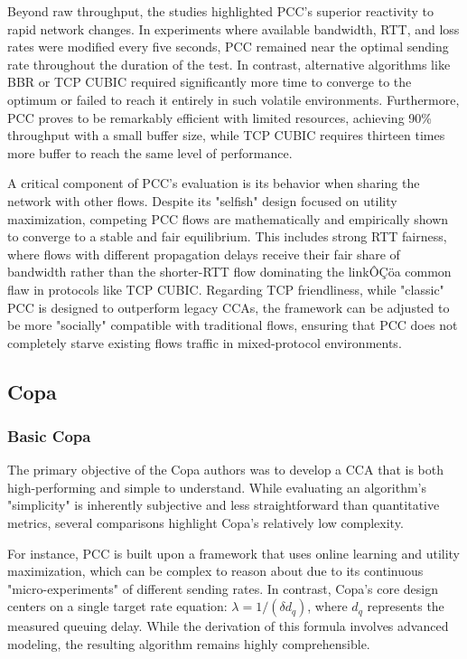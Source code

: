 \documentclass[conference]{IEEEtran}
\begin{document}
Beyond raw throughput, the studies highlighted PCC's superior reactivity to rapid network changes. 
In experiments where available bandwidth, RTT, and loss rates were modified every five seconds, PCC remained near the optimal sending rate throughout the duration of the test\cite{PCC}. 
In contrast, alternative algorithms like BBR or TCP CUBIC required significantly more time to converge to the optimum or failed to reach it entirely in such volatile environments. 
Furthermore, PCC proves to be remarkably efficient with limited resources, achieving 90\% throughput with a small buffer size, while TCP CUBIC requires thirteen times more buffer to reach the same level of performance\cite{PCCEVALUATION}. 

A critical component of PCC's evaluation is its behavior when sharing the network with other flows. 
Despite its "selfish" design focused on utility maximization, competing PCC flows are mathematically and empirically shown to converge to a stable and fair equilibrium\cite{PCC}. 
This includes strong RTT fairness, where flows with different propagation delays receive their fair share of bandwidth rather than the shorter-RTT flow dominating the linkÔÇöa common flaw in protocols like TCP CUBIC. 
Regarding TCP friendliness, while "classic" PCC is designed to outperform legacy \acs{CCA}s, the framework can be adjusted to be more "socially" compatible with traditional flows, ensuring that PCC does not completely starve existing flows traffic in mixed-protocol environments.

\subsection{Copa}

\subsubsection{Basic Copa}

The primary objective of the Copa authors was to develop a \acs{CCA} that is both high-performing and simple to understand. 
While evaluating an algorithm's "simplicity" is inherently subjective and less straightforward than quantitative metrics, several comparisons highlight Copa's relatively low complexity.  

For instance, PCC is built upon a framework that uses online learning and utility maximization, which can be complex to reason about due to its continuous "micro-experiments" of different sending rates. 
In contrast, Copa's core design centers on a single target rate equation: $\lambda = 1/(\delta d_q)$, where $d_q$ represents the measured queuing delay. 
While the derivation of this formula involves advanced modeling, the resulting algorithm remains highly comprehensible.  
\end{document}
